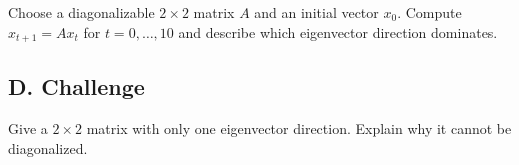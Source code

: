 \begin{exercise}
Choose a diagonalizable $2\times 2$ matrix $A$ and an initial vector $x_0$.
Compute $x_{t+1}=Ax_t$ for $t=0,\ldots,10$ and describe which eigenvector
direction dominates.
\end{exercise}

\subsection*{D. Challenge}

\begin{exercise}
Give a $2\times 2$ matrix with only one eigenvector direction. Explain why it
cannot be diagonalized.
\end{exercise}

